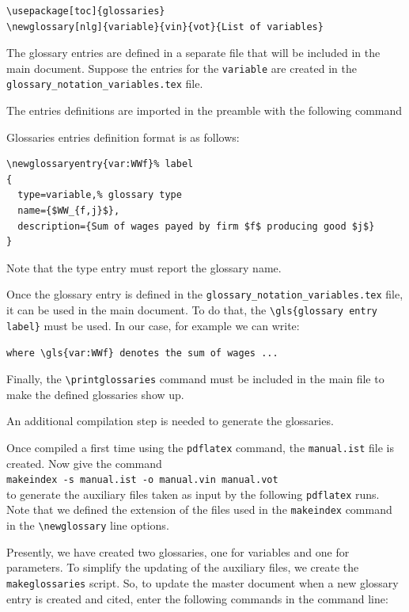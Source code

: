 \documentclass{book}
\begin{document}
\begin{verbatim}
\usepackage[toc]{glossaries}
\newglossary[nlg]{variable}{vin}{vot}{List of variables}
\end{verbatim}

The glossary entries are defined in a separate file that will be included in the main document. Suppose the entries for the \verb+variable+ are created in the \verb+glossary_notation_variables.tex+ file. 

The entries definitions are imported in the preamble with the following command\\
\verb++

Glossaries entries definition format is as follows:

\begin{verbatim}
\newglossaryentry{var:WWf}% label 
{ 
  type=variable,% glossary type 
  name={$WW_{f,j}$}, 
  description={Sum of wages payed by firm $f$ producing good $j$} 
}
\end{verbatim}

Note that the type entry must report the glossary name.

Once the glossary entry is defined in the \verb+glossary_notation_variables.tex+ file, it can be used in the main document. To do that, the 
\verb+\gls{glossary entry label}+ must be used. In our case, for example we can write:

\verb+where \gls{var:WWf} denotes the sum of wages ...+

Finally, the \verb+\printglossaries+ command must be included in the main file to make the defined glossaries show up. 

An additional compilation step is needed to generate the glossaries.

Once compiled a first time using the \verb+pdflatex+ command, the \verb+manual.ist+ file is created. Now give the command\\
\verb+makeindex -s manual.ist -o manual.vin manual.vot+\\
to generate the auxiliary files taken as input by the following \verb+pdflatex+ runs. Note that we defined the extension of the files used in the \verb+makeindex+ command in the \verb+\newglossary+ line options.

Presently, we have created two glossaries, one for variables and one for parameters.
To simplify the updating of the auxiliary files, we create the \verb+makeglossaries+ script. So, to update the master document when a new glossary entry is created and cited, enter the following commands in the command line:
\end{document}
